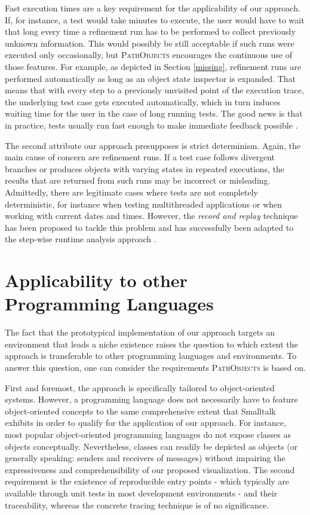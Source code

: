 Fast execution times are a key requirement for the applicability of our approach.
If, for instance, a test would take minutes to execute, the user would have to wait that long every time a refinement run has to be performed to collect previously unknown information.
This would possibly be still acceptable if such runs were executed only occasionally, but \textsc{PathObjects} encourages the continuous use of those features.
For example, as depicted in Section \ref{missing}, refinement runs are performed automatically as long as an object state inspector is expanded.
That means that with every step to a previously unvisited point of the execution trace, the underlying test case gets executed automatically, which in turn induces waiting time for the user in the case of long running tests. The good news is that in practice, tests usually run fast enough to make immediate feedback possible \cite{perscheid_immediacy_2010}.

The second attribute our approach presupposes is strict determinism.
Again, the main cause of concern are refinement runs.
If a test case follows divergent branches or produces objects with varying states in repeated executions, the results that are returned from such runs may be incorrect or misleading.
Admittedly, there are legitimate cases where tests are not completely deterministic, for instance when testing multithreaded applications or when working with current dates and times.
However, the \emph{record and replay} technique has been proposed to tackle this problem \cite{choi_deterministic_1998} and has successfully been adapted to the step-wise runtime analysis approach \cite{felgentreff_comparison_2012}.

\section{Applicability to other Programming Languages}
The fact that the prototypical implementation of our approach targets an environment that leads a niche existence raises the question to which extent the approach is transferable to other programming languages and environments.
To answer this question, one can consider the requirements \textsc{PathObjects} is based on.

First and foremost, the approach is specifically tailored to object-oriented systems.
However, a programming language does not necessarily have to feature object-oriented concepts to the same comprehensive extent that Smalltalk exhibits in order to qualify for the application of our approach.
For instance, most popular object-oriented programming languages do not expose classes as objects conceptually. 
Nevertheless, classes can readily be depicted as objects (or generally speaking: senders and receivers of messages) without impairing the expressiveness and comprehensibility of our proposed visualization.
The second requirement is the existence of reproducible entry points - which typically are available through unit tests in most development environments - and their traceability, whereas the concrete tracing technique is of no significance.

